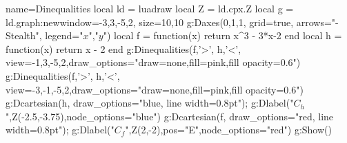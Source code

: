 \documentclass[border=2 mm]{standalone}
\begin{document}
\begin{luadraw}{name=Dinequalities}
local ld = luadraw
local Z = ld.cpx.Z
local g = ld.graph:new{window={-3,3,-5,2}, size={10,10}}
g:Daxes({0,1,1}, {grid=true, arrows="-Stealth", legend={"$x$","$y$"}})
local f = function(x) return x^3 - 3*x-2 end
local h = function(x) return x - 2 end
g:Dinequalities({f,'>', h,'<'}, {view={-1,3,-5,2},draw_options="draw=none,fill=pink,fill opacity=0.6"})
g:Dinequalities({f,'>', h,'<'}, {view={-3,-1,-5,2},draw_options="draw=none,fill=pink,fill opacity=0.6"})
g:Dcartesian(h, {draw_options="blue, line width=0.8pt"}); g:Dlabel("$C_h$",Z(-2.5,-3.75),{node_options="blue"})
g:Dcartesian(f, {draw_options="red, line width=0.8pt"}); g:Dlabel("$C_f$",Z(2,-2),{pos="E",node_options="red"})
g:Show()
\end{luadraw}
\end{document}
